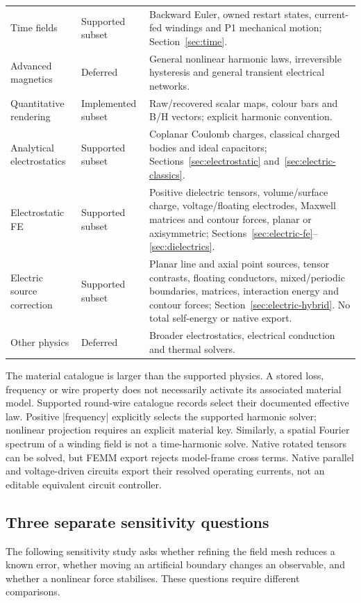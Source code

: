 \begin{longtable}{p{.24\linewidth}p{.13\linewidth}p{.53\linewidth}}
Time fields & Supported subset & Backward Euler, owned restart states, current-fed windings and P1 mechanical motion; Section~\ref{sec:time}.\\
Advanced magnetics & Deferred & General nonlinear harmonic laws, irreversible hysteresis and general transient electrical networks.\\
Quantitative rendering & Implemented subset & Raw/recovered scalar maps, colour bars and B/H vectors; explicit harmonic convention.\\
Analytical electrostatics & Supported subset & Coplanar Coulomb charges, classical charged bodies and ideal capacitors; Sections~\ref{sec:electrostatic} and~\ref{sec:electric-classics}.\\
Electrostatic FE & Supported subset & Positive dielectric tensors, volume/surface charge, voltage/floating electrodes, Maxwell matrices and contour forces, planar or axisymmetric; Sections~\ref{sec:electric-fe}--\ref{sec:dielectrics}.\\
Electric source correction & Supported subset & Planar line and axial point sources, tensor contrasts, floating conductors, mixed/periodic boundaries, matrices, interaction energy and contour forces; Section~\ref{sec:electric-hybrid}. No total self-energy or native export.\\
Other physics & Deferred & Broader electrostatics, electrical conduction and thermal solvers.\\
\bottomrule
\end{longtable}

The material catalogue is larger than the supported physics. A stored loss,
frequency or wire property does not necessarily activate its associated material model.
Supported round-wire catalogue records select their documented effective law.
Positive |frequency| explicitly selects the supported harmonic solver; nonlinear projection requires an explicit material key. Similarly,
a spatial Fourier spectrum of a winding field is not a time-harmonic solve.
Native rotated tensors can be solved, but FEMM export rejects model-frame
cross terms. Native parallel and voltage-driven circuits export their resolved
operating currents, not an editable equivalent circuit controller.

\subsection{Three separate sensitivity questions}
The following sensitivity study asks whether refining the field mesh reduces a known error, whether
moving an artificial boundary changes an observable, and whether a nonlinear
force stabilises. These questions require different comparisons.

